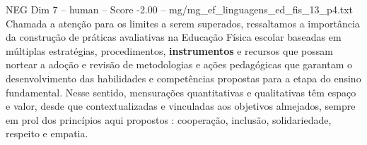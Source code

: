 \begin{textsample}{NEG Dim 7 – human – Score -2.00 – mg/mg\_ef\_linguagens\_ed\_fis\_13\_p4.txt}  \label{ex:f7_neg_019}
Chamada a atenção para os limites a serem superados, ressaltamos a importância da construção de práticas avaliativas na Educação Física escolar baseadas em múltiplas estratégias, procedimentos, \textbf{instrumentos} e recursos que possam nortear a adoção e revisão de metodologias e ações pedagógicas que garantam o desenvolvimento das habilidades e competências propostas para a etapa do ensino fundamental.
Nesse sentido, mensurações quantitativas e qualitativas têm espaço e valor, desde que contextualizadas e vinculadas aos objetivos almejados, sempre em prol dos princípios aqui propostos : cooperação, inclusão, solidariedade, respeito e empatia.

\end{textsample}
